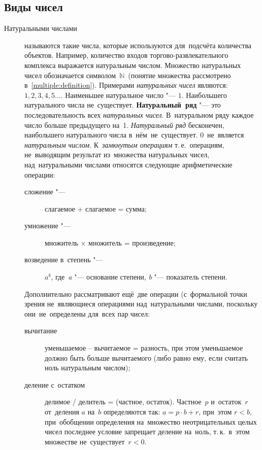 \documentclass[]{scrartcl}
\begin{document}
\subsection{Виды чисел}
\begin{description}
	\item[Натуральными числами] называются такие числа, которые используются для~подсчёта количества объектов. Например, количество входов торгово-развлекательного комплекса выражается натуральным числом. Множество натуральных чисел обозначается символом~$\mathbb{N}$~(понятие множества рассмотрено в~\ref{multiple:definition}). Примерами \emph{натуральных чисел} являются:~$1, 2, 3, 4, 5\ldots$. Наименьшее натуральное число "--- $1$. Наибольшего натурального числа не~существует. \textbf{Натуральный~ряд} "--- это последовательность всех \emph{натуральных чисел}. В~натуральном ряду каждое число больше предыдущего на~1. \emph{Натуральный ряд} бесконечен, наибольшего натурального числа в~нём~не~существует. $0$~не~является \emph{натуральным числом}.
	К~\emph{замкнутым операциям} т.\,е.~операциям, не~выводящим результат из~множества натуральных чисел, над~натуральными числами относятся следующие арифметические операции:
	\begin{description}
		\item[сложение "---] слагаемое + слагаемое = сумма;
		\item[умножение "---]  множитель $\times$ множитель = произведение;
		\item[возведение в~степень "---] ${\textstyle a^b}$, где~\textit{a} "--- основание степени, \textit{b} "--- показатель степени.
	\end{description}
Дополнительно рассматривают ещё~две операции (с~формальной точки зрения не~являющиеся операциями над~натуральными числами, поскольку они~не~определены для~всех пар чисел:
\begin{description}
	\item[вычитание] уменьшаемое -- вычитаемое = разность, при этом уменьшаемое должно быть больше вычитаемого (либо равно ему, если считать ноль натуральным числом);
	\item[деление с~остатком] делимое / делитель = (частное, остаток). Частное~${\textstyle p}$ и~остаток~${\textstyle r}$ от~деления ${\textstyle a}$ на~${\textstyle b}$ определяются так: ${\textstyle a=p\cdot b+r}$, при~этом ${\textstyle r<b}$, при~обобщении определения на~множество неотрицательных целых чисел последнее условие запрещает деление на~ноль, т.\,к.~в~этом множестве не~существует~${\textstyle r<0}$.
\end{description}



\end{description}
\end{document}
